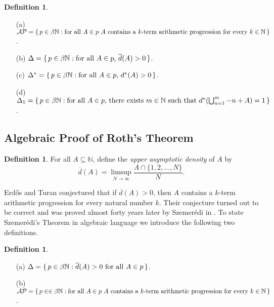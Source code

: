 \documentclass[12pt]{article}
\theoremstyle{plain}
\theoremstyle{definition}
\newtheorem{defn}[thm]{Definition}
\newcommand{\bbN}{\mathbb{N}}
\begin{document}
  \begin{defn}
    \begin{itemize}
      \item[(a)] $\mathcal{AP} = \{\, p \in \beta\bbN : \hbox{for all
          $A \in p$ $A$ contains a $k$-term arithmetic progression
          for every $k \in \bbN$} \,\}$.
      \item[(b)] $\Delta = \{\, p \in \beta\bbN : \hbox{for all $A \in
          p$, $\overline{d}(A) > 0$} \,\}$.
      \item[(c)] $\Delta^* = \{\, p \in \beta\bbN : \hbox{for all $A
          \in p$, $d^*(A) > 0$} \,\}$.
      \item[(d)] $\Delta_1 = \{\, p \in \beta\bbN : \hbox{for all $A
            \in p$, there exists $m \in \bbN$ such that
            $d^*(\bigcup_{n=1}^m -n+A) = 1$} \,\}$.
    \end{itemize}
  \end{defn}


\subsection{Algebraic Proof of Roth's Theorem}

  \begin{defn}
    For all $A \subseteq \bbN$, define the \textsl{upper asymptotic
      density} of $A$ by 
      \[
        \overline{d}(A) = \limsup_{N\to\infty} \frac{A \cap \{1, 2,
          \ldots, N\}}{N}.
      \]
  \end{defn}

Erd\H{o}s and Turan conjectured that if $\overline{d}(A) > 0$, then
$A$ contains a $k$-term arithmetic progression for every natural
number $k$.
Their conjecture turned out to be correct and was proved almost forty
years later by Szemer\'{e}di in \cite{Szemeredi:1975uq}. 
To state Szemer\'{e}di's Theorem in algebraic language we introduce
the following two definitions.
  \begin{defn}
    \begin{itemize}
      \item[(a)] $\Delta = \{\, p \in \beta\bbN : \overline{d}(A) > 0
        \hbox{ for all } A \in p \,\}$.
      \item[(b)] $\mathcal{AP} = \{\, p \in \in \beta\bbN : \hbox{for
          all $A \in p$ } A \hbox{ contains a $k$-term arithmetic
          progression for every $k \in \bbN$} \,\}$.
    \end{itemize}
  \end{defn}
\end{document}
